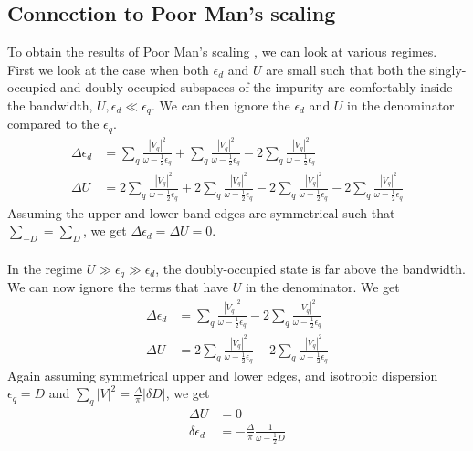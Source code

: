 \documentclass[twoside]{report}
\numberwithin{equation}{section}
\begin{document}
\subsection{Connection to Poor Man's scaling}\label{urg2pms}
To obtain the results of Poor Man's scaling \cite{haldane}\cite{Jefferson},  we can look at various regimes. First we look at the case when both \(\epsilon_d\) and \(U\) are small such that both the singly-occupied and doubly-occupied subspaces of the impurity are comfortably inside the bandwidth, \(U,\epsilon_d \ll \epsilon_q\). We can then ignore the \(\epsilon_d\) and \(U\) in the denominator compared to the \(\epsilon_q\).
\begin{equation}\begin{aligned}
\Delta \epsilon_d &= \sum_{q}\frac{|V_q|^2}{\omega - \frac{1}{2}\epsilon_q} + \sum_{q}\frac{|V_q|^2}{\omega - \frac{1}{2}\epsilon_q} - 2\sum_{q}\frac{|V_q|^2}{\omega - \frac{1}{2}\epsilon_q}\\
\Delta U &= 2\sum_{q}\frac{|V_q|^2}{\omega - \frac{1}{2}\epsilon_q} + 2\sum_{q}\frac{|V_q|^2}{\omega - \frac{1}{2}\epsilon_q} - 2\sum_{q}\frac{|V_q|^2}{\omega - \frac{1}{2}\epsilon_q} - 2\sum_{q}\frac{|V_q|^2}{\omega - \frac{1}{2}\epsilon_q}
\end{aligned}\end{equation}
Assuming the upper and lower band edges are symmetrical such that \(\sum_{-D} = \sum_D\), we get \(\Delta \epsilon_d = \Delta U = 0\). 
\\\\In the regime \(U \gg \epsilon_q \gg \epsilon_d\), the doubly-occupied state is far above the bandwidth. We can now ignore the terms that have \(U\) in the denominator. We get
\begin{equation}\begin{aligned}
\Delta \epsilon_d &= \sum_{q}\frac{|V_q|^2}{\omega - \frac{1}{2}\epsilon_q} - 2\sum_{q}\frac{|V_q|^2}{\omega - \frac{1}{2}\epsilon_q}\\
\Delta U &= 2\sum_{q}\frac{|V_q|^2}{\omega - \frac{1}{2}\epsilon_q}  - 2\sum_{q}\frac{|V_q|^2}{\omega - \frac{1}{2}\epsilon_q} 
\end{aligned}\end{equation}
Again assuming symmetrical upper and lower edges, and isotropic dispersion \(\epsilon_q=D\) and \(\sum_q |V|^2 = \frac{\Delta}{\pi}|\delta D|\), we get
\begin{equation}\begin{aligned}
\Delta U &= 0\\
\delta \epsilon_d &= -\frac{\Delta}{\pi}\frac{1}{\omega - \frac{1}{2} D}
\end{aligned}\end{equation}
\end{document}
